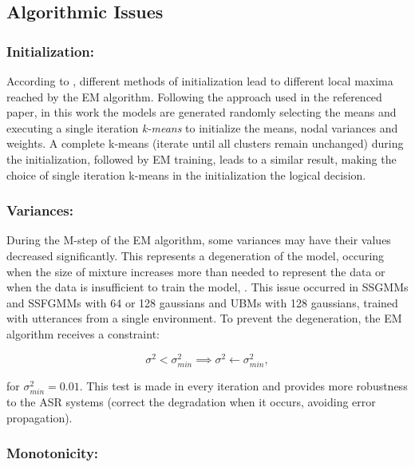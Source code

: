 \subsection{Algorithmic Issues}

\subsubsection{Initialization:}

According to , different methods of initialization lead to different local maxima reached by the EM algorithm. Following the approach used in the referenced paper, in this work the models are generated randomly selecting the means and executing a single iteration \emph{k-means} to initialize the means, nodal variances and weights. A complete k-means (iterate until all clusters remain unchanged) during the initialization, followed by EM training, leads to a similar result, making the choice of single iteration k-means in the initialization the logical decision.

\subsubsection{Variances:}

During the M-step of the EM algorithm, some variances may have their values decreased significantly. This represents a degeneration of the model, occuring when the size of mixture increases more than needed to represent the data or when the data is insufficient to train the model, . This issue occurred in SSGMMs and SSFGMMs with 64 or 128 gaussians and UBMs with 128 gaussians, trained with utterances from a single environment. To prevent the degeneration, the EM algorithm receives a constraint:

\begin{equation}
    \sigma^2 < \sigma_{min}^2 \implies \sigma^2 \gets \sigma_{min}^2,
    \label{eq:variance-prune}
\end{equation}

\noindent for $\sigma_{min}^2 = 0.01$. This test is made in every iteration and provides more robustness to the ASR systems (correct the degradation when it occurs, avoiding error propagation).

\subsubsection{Monotonicity:}

